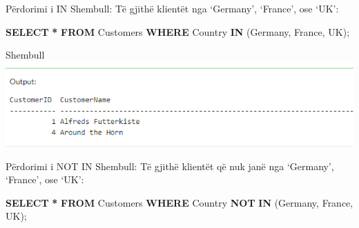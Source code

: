 \documentclass[
  ignorenonframetext,
]{beamer}
\newenvironment{Shaded}{\begin{snugshade}}{\end{snugshade}}
\newcommand{\KeywordTok}[1]{\textcolor[rgb]{0.13,0.29,0.53}{\textbf{#1}}}
\newcommand{\NormalTok}[1]{#1}
\newcommand{\OperatorTok}[1]{\textcolor[rgb]{0.81,0.36,0.00}{\textbf{#1}}}
\newcommand{\StringTok}[1]{\textcolor[rgb]{0.31,0.60,0.02}{#1}}
\begin{document}
\begin{frame}[fragile]{Përdorimi i IN}
\label{puxebrdorimi-i-in}
Shembull: Të gjithë klientët nga `Germany', `France', ose `UK':

\begin{Shaded}
\begin{Highlighting}[]
\KeywordTok{SELECT} \OperatorTok{*}
\KeywordTok{FROM}\NormalTok{ Customers}
\KeywordTok{WHERE}\NormalTok{ Country }\KeywordTok{IN}\NormalTok{ (}\StringTok{\textquotesingle{}Germany\textquotesingle{}}\NormalTok{, }\StringTok{\textquotesingle{}France\textquotesingle{}}\NormalTok{, }\StringTok{\textquotesingle{}UK\textquotesingle{}}\NormalTok{);}
\end{Highlighting}
\end{Shaded}
\end{frame}

\begin{frame}{Shembull}
\label{shembull-20}
\includegraphics{./Figs/query75.png}
\end{frame}

\begin{frame}[fragile]{Përdorimi i NOT IN}
\label{puxebrdorimi-i-not-in}
Shembull: Të gjithë klientët që nuk janë nga `Germany', `France', ose
`UK':

\begin{Shaded}
\begin{Highlighting}[]
\KeywordTok{SELECT} \OperatorTok{*}
\KeywordTok{FROM}\NormalTok{ Customers}
\KeywordTok{WHERE}\NormalTok{ Country }\KeywordTok{NOT} \KeywordTok{IN}\NormalTok{ (}\StringTok{\textquotesingle{}Germany\textquotesingle{}}\NormalTok{, }\StringTok{\textquotesingle{}France\textquotesingle{}}\NormalTok{, }\StringTok{\textquotesingle{}UK\textquotesingle{}}\NormalTok{);}
\end{Highlighting}
\end{Shaded}
\end{frame}
\end{document}
